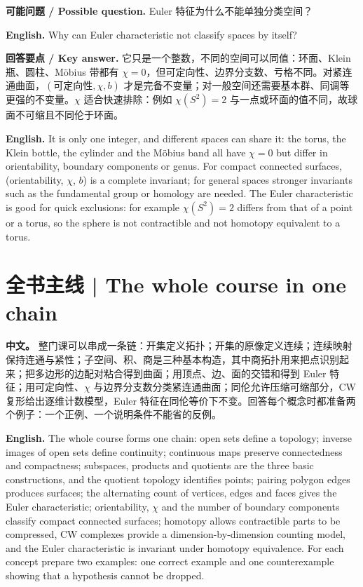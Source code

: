 \documentclass[UTF8,11pt,a4paper]{ctexart}
\newcommand{\EN}[1]{\par\noindent\textbf{English.} #1\par}
\newcommand{\ASK}[4]{\par\noindent\textbf{可能问题 / Possible question.} #1\par\EN{#2}\noindent\textbf{回答要点 / Key answer.} #3\par\EN{#4}\medskip}
\newcommand{\APS}[2]{\par\noindent\textbf{中文。} #1\par\noindent\textbf{English.} #2\par\smallskip}
\begin{document}
\ASK{Euler 特征为什么不能单独分类空间？}{Why can Euler characteristic not classify spaces by itself?}{它只是一个整数，不同的空间可以同值：环面、Klein 瓶、圆柱、M\"obius 带都有 $\chi=0$，但可定向性、边界分支数、亏格不同。对紧连通曲面，$(\text{可定向性},\chi,b)$ 才是完备不变量；对一般空间还需要基本群、同调等更强的不变量。$\chi$ 适合快速排除：例如 $\chi(S^2)=2$ 与一点或环面的值不同，故球面不可缩且不同伦于环面。}{It is only one integer, and different spaces can share it: the torus, the Klein bottle, the cylinder and the M\"obius band all have $\chi=0$ but differ in orientability, boundary components or genus. For compact connected surfaces, (orientability, $\chi$, $b$) is a complete invariant; for general spaces stronger invariants such as the fundamental group or homology are needed. The Euler characteristic is good for quick exclusions: for example $\chi(S^2)=2$ differs from that of a point or a torus, so the sphere is not contractible and not homotopy equivalent to a torus.}

\section*{全书主线 | The whole course in one chain}
\APS{整门课可以串成一条链：开集定义拓扑；开集的原像定义连续；连续映射保持连通与紧性；子空间、积、商是三种基本构造，其中商拓扑用来把点识别起来；把多边形的边配对粘合得到曲面；用顶点、边、面的交错和得到 Euler 特征；用可定向性、$\chi$ 与边界分支数分类紧连通曲面；同伦允许压缩可缩部分，CW 复形给出逐维计数模型，Euler 特征在同伦等价下不变。回答每个概念时都准备两个例子：一个正例、一个说明条件不能省的反例。}{The whole course forms one chain: open sets define a topology; inverse images of open sets define continuity; continuous maps preserve connectedness and compactness; subspaces, products and quotients are the three basic constructions, and the quotient topology identifies points; pairing polygon edges produces surfaces; the alternating count of vertices, edges and faces gives the Euler characteristic; orientability, $\chi$ and the number of boundary components classify compact connected surfaces; homotopy allows contractible parts to be compressed, CW complexes provide a dimension-by-dimension counting model, and the Euler characteristic is invariant under homotopy equivalence. For each concept prepare two examples: one correct example and one counterexample showing that a hypothesis cannot be dropped.}
\end{document}
